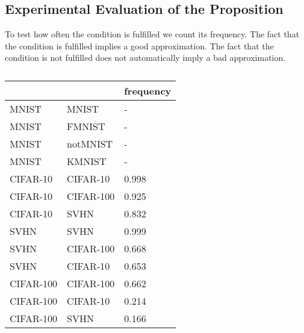 \subsection*{Experimental Evaluation of the Proposition}

To test how often the condition is fulfilled we count its frequency. The fact that the condition is fulfilled implies a good approximation. The fact that the condition is not fulfilled does not automatically imply a bad approximation.

\begin{table}[h!]
	\scriptsize
    \centering
    \begin{tabularx}{\textwidth}{@{}XX|| X@{}}%
	     \toprule
         & & frequency \\
         \midrule
         MNIST & MNIST & - \\
         MNIST & FMNIST & -\\
         MNIST & notMNIST & -\\
         MNIST & KMNIST & - \\
         \midrule
         CIFAR-10 & CIFAR-10  & 0.998 \\
         CIFAR-10 & CIFAR-100 & 0.925 \\
         CIFAR-10 & SVHN      & 0.832 \\
         \midrule
         SVHN & SVHN       &  0.999 \\
         SVHN & CIFAR-100  &  0.668 \\
         SVHN & CIFAR-10   &  0.653 \\
         \midrule
         CIFAR-100 & CIFAR-100 &  0.662 \\
         CIFAR-100 & CIFAR-10  &  0.214\\
         CIFAR-100 & SVHN      &  0.166\\
         \bottomrule
    \end{tabularx}
    \caption{}
    \label{tab:conditions_table}
\end{table}